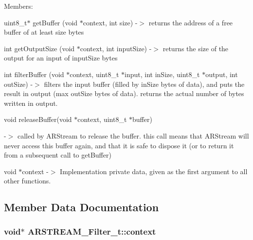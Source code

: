 Members\+:
\begin{DoxyItemize}
\item uint8\+\_\+t$\ast$ get\+Buffer (void $\ast$context, int size) -\/$>$ returns the address of a free buffer of at least size bytes
\item int get\+Output\+Size (void $\ast$context, int input\+Size) -\/$>$ returns the size of the output for an input of input\+Size bytes
\item int filter\+Buffer (void $\ast$context, uint8\+\_\+t $\ast$input, int in\+Size, uint8\+\_\+t $\ast$output, int out\+Size) -\/$>$ filters the input buffer (filled by in\+Size bytes of data), and puts the result in output (max out\+Size bytes of data). returns the actual number of bytes written in output.
\item void release\+Buffer(void $\ast$context, uint8\+\_\+t $\ast$buffer)
\end{DoxyItemize}

-\/$>$ called by A\+R\+Stream to release the buffer. this call means that A\+R\+Stream will never access this buffer again, and that it is safe to dispose it (or to return it from a subsequent call to get\+Buffer)
\begin{DoxyItemize}
\item void $\ast$context -\/$>$ Implementation private data, given as the first argument to all other functions. 
\end{DoxyItemize}

\subsection{Member Data Documentation}
\subsubsection[{\texorpdfstring{context}{context}}]{\setlength{\rightskip}{0pt plus 5cm}void$\ast$ A\+R\+S\+T\+R\+E\+A\+M\+\_\+\+Filter\+\_\+t\+::context}\hypertarget{struct_a_r_s_t_r_e_a_m___filter__t_a8c0052e7db6a36a634489e20ed266c75}{}\label{struct_a_r_s_t_r_e_a_m___filter__t_a8c0052e7db6a36a634489e20ed266c75}
